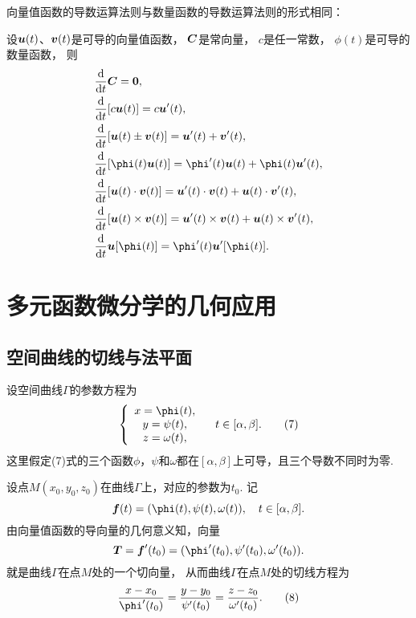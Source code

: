 向量值函数的导数运算法则与数量函数的导数运算法则的形式相同：
\begin{theorem}[向量值函数的导数运算法则]
设\(\boldsymbol{u}(t)\)、\(\boldsymbol{v}(t)\)是可导的向量值函数，
\(\boldsymbol{C}\)是常向量，
\(c\)是任一常数，
\(\phi(t)\)是可导的数量函数，
则\begin{align}
	&\dv{t} \vb{C}
		= \vb{0}, \\
	&\dv{t} [c \vb{u}(t)]
		= c \vb{u}'(t), \\
	&\dv{t} [\vb{u}(t) \pm \vb{v}(t)]
		= \vb{u}'(t) + \vb{v}'(t), \\
	&\dv{t} [\phi(t) \vb{u}(t)]
		= \phi'(t) \vb{u}(t) + \phi(t) \vb{u}'(t), \\
	&\dv{t} [\vb{u}(t) \cdot \vb{v}(t)]
		= \vb{u}'(t) \cdot \vb{v}(t) + \vb{u}(t) \cdot \vb{v}'(t), \\
	&\dv{t} [\vb{u}(t) \times \vb{v}(t)]
		= \vb{u}'(t) \times \vb{v}(t) + \vb{u}(t) \times \vb{v}'(t), \\
	&\dv{t} \vb{u}[\phi(t)]
		= \phi'(t) \vb{u}'[\phi(t)].
\end{align}
\end{theorem}

\section{多元函数微分学的几何应用}
\subsection{空间曲线的切线与法平面}
设空间曲线\(\Gamma\)的参数方程为\begin{gather}
\left\{ \begin{array}{c}
x = \phi(t), \\
y = \psi(t), \\
z = \omega(t), \\
\end{array} \right.
\quad
t \in [\alpha,\beta].
\tag7
\end{gather}这里假定(7)式的三个函数\(\phi\)，\(\psi\)和\(\omega\)都在\([\alpha,\beta]\)上可导，且三个导数不同时为零.

设点\(M(x_0,y_0,z_0)\)在曲线\(\Gamma\)上，对应的参数为\(t_0\).
记\[
	\vb{f}(t)
	= (\phi(t),\psi(t),\omega(t)),
	\quad t\in[\alpha,\beta].
\]
由向量值函数的导向量的几何意义知，向量
\begin{equation}
	\vb{T}
	= \vb{f}'(t_0)
	= (\phi'(t_0),\psi'(t_0),\omega'(t_0)).
\end{equation}
就是曲线\(\Gamma\)在点\(M\)处的一个切向量，
从而曲线\(\Gamma\)在点\(M\)处的切线方程为
\begin{gather}
	\frac{x-x_0}{\phi'(t_0)}
	=\frac{y-y_0}{\psi'(t_0)}
	=\frac{z-z_0}{\omega'(t_0)}.
	\tag8
\end{gather}

